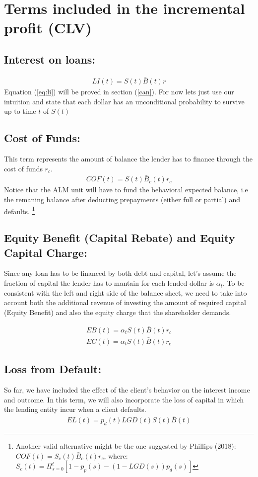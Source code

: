 \section{ Terms included in the incremental profit (CLV)}
\subsection{ Interest on loans: }
\begin{align}
LI(t) = S(t)\bar{ B}(t)r \label{eq:li}
\end{align}
Equation (\ref{eq:li}) will be proved in section (\ref{can}). For now lets just use our intuition and state that each dollar has an unconditional probability to survive up to time $t$ of $S(t)$ 
\subsection{  Cost of Funds: }
This term represents the amount of balance the lender has to finance through the cost of funds $r_c$. 
\begin{align}
    COF(t) = S(t)\bar{B}_c(t)r_c
\end{align}
Notice that the ALM unit will have to fund the behavioral expected balance, i.e the remaning balance after deducting prepayments (either full or partial) and defaults. 
\footnote{ Another valid alternative might be the one suggested by Phillips (2018):
$
COF(t) = S_c(t)\bar{ B}_c(t)r_c
$,
where: 
$
S_c(t)= \Pi_{s=0}^t [1- p_p(s)-(1-LGD(s))p_d(s) ]
$}


\subsection{ Equity Benefit (Capital Rebate) and Equity Capital Charge: }
Since any loan has to be financed by both debt and capital, let's assume the fraction of capital the lender has to mantain for each lended dollar is $\alpha_t$. To be consistent with the left and right side of the balance sheet, we need to take into account both the additional revenue of investing the amount of required capital (Equity Benefit) and also the equity charge that the shareholder demands.

\begin{align}
EB(t) = \alpha_t S(t)\bar{ B}(t) r_c
\end{align}
\begin{align}
 EC(t) =  \alpha_t S(t)\bar{ B}(t) r_e
\end{align}

\subsection{ Loss from Default: }
So far, we have included the effect of the client's behavior on the interest income and outcome. In this term, we will also incorporate the loss of capital in which the lending entity incur when a client defaults. 
\begin{align}
EL(t) =  p_d(t)LGD(t)S(t)\bar{ B}(t) 
\end{align}

